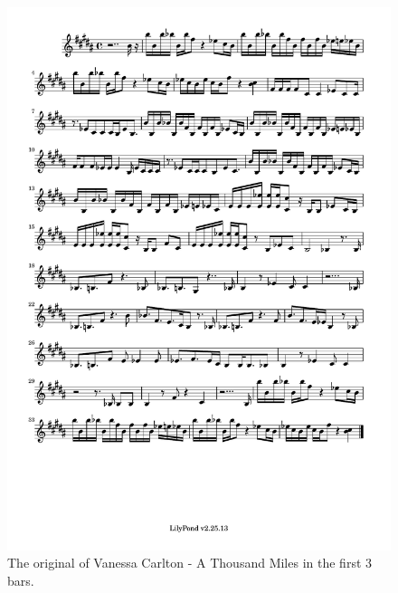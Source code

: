 \documentclass[11pt]{article}
\begin{document}
\begin{figure}
\centering
\includegraphics[trim=1cm 26.5cm 1cm 0.5cm, clip, scale=0.6]{Original_ATM.pdf}
\caption{The original of Vanessa Carlton - A Thousand Miles in the first 3 bars.} 
\label{fig:OATM}
\end{figure}
\end{document}
